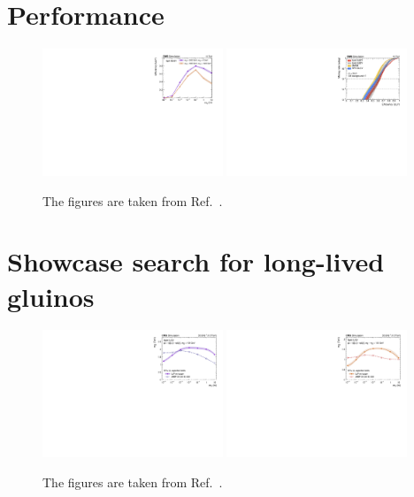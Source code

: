\documentclass{webofc}
\begin{document}
\section{Performance}

\begin{figure}[!ht]
\includegraphics[width=0.48\textwidth]{figs/ctau.pdf}\hspace{0.03\textwidth}
\includegraphics[width=0.48\textwidth]{figs/roc_1.pdf}
\centering
\caption{The figures are taken from Ref.~\cite{CMS-EXO-19-011}.}
\label{fig-3}
\end{figure}

\section{Showcase search for long-lived gluinos}

\begin{figure}[!ht]
\includegraphics[width=0.48\textwidth]{figs/summaryU.pdf}\hspace{0.03\textwidth}
\includegraphics[width=0.48\textwidth]{figs/summaryC.pdf}
\centering
\caption{The figures are taken from Ref.~\cite{CMS-EXO-19-011}.}
\label{fig-4}
\end{figure}
\end{document}
